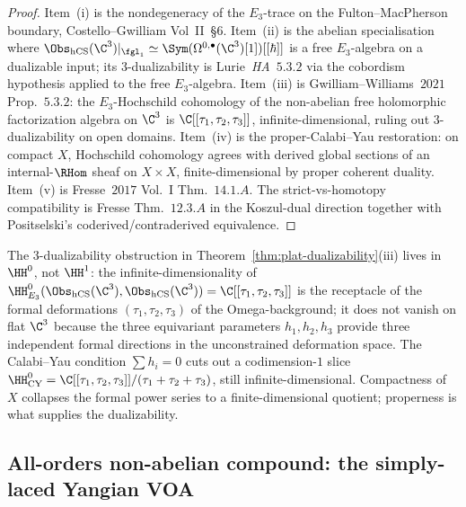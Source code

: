\begin{proof}
Item~(i) is the nondegeneracy of the $E_3$-trace on the Fulton--MacPherson
boundary, Costello--Gwilliam Vol~II~\S$6$. Item~(ii) is the abelian
specialisation where
$\Obs_{\hCS}(\C^3)|_{\fgl_1} \simeq \Sym(\Omega^{0,\bullet}(\C^3)[1])[[\hbar]]$
is a free $E_3$-algebra on a dualizable input; its
$3$-dualizability is Lurie~\emph{HA}~$5.3.2$ via the cobordism hypothesis
applied to the free $E_3$-algebra.
Item~(iii) is Gwilliam--Williams~$2021$ Prop.~$5.3.2$: the
$E_3$-Hochschild cohomology of the non-abelian free
holomorphic factorization algebra on $\C^3$ is
$\C[[\tau_1,\tau_2,\tau_3]]$, infinite-dimensional, ruling out
$3$-dualizability on open domains.
Item~(iv) is the proper-Calabi--Yau restoration: on compact $X$,
Hochschild cohomology agrees with derived global sections of an
internal-$\RHom$ sheaf on $X \times X$, finite-dimensional by proper
coherent duality.
Item~(v) is Fresse~$2017$ Vol.~I Thm.~$14.1.A$. The strict-vs-homotopy
compatibility is Fresse Thm.~$12.3.A$ in the Koszul-dual direction
together with Positselski's coderived/contraderived equivalence.
\end{proof}

\begin{remark}
\label{rem:plat-dualizability-HH0}
The $3$-dualizability obstruction in
Theorem~\ref{thm:plat-dualizability}(iii) lives in $\HH^0$, not $\HH^1$:
the infinite-dimensionality of $\HH^0_{E_3}(\Obs_{\hCS}(\C^3),
\Obs_{\hCS}(\C^3)) = \C[[\tau_1, \tau_2, \tau_3]]$ is the receptacle
of the formal deformations
$(\tau_1, \tau_2, \tau_3)$ of the Omega-background;
it does not vanish on flat $\C^3$ because the three equivariant
parameters $h_1, h_2, h_3$ provide three independent formal directions
in the unconstrained deformation space. The Calabi--Yau condition
$\sum h_i = 0$ cuts out a codimension-$1$ slice
$\HH^0_{\mathrm{CY}} = \C[[\tau_1, \tau_2, \tau_3]]/(\tau_1 + \tau_2 + \tau_3)$,
still infinite-dimensional. Compactness of $X$ collapses the formal
power series to a finite-dimensional quotient; properness is what
supplies the dualizability.
\end{remark}

\subsection{All-orders non-abelian compound: the simply-laced Yangian VOA}
\label{subsec:hcs-nonab-compound}

